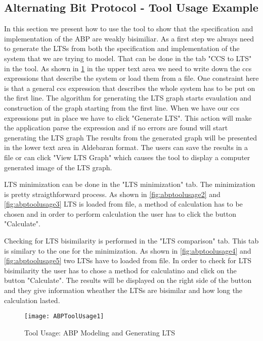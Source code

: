 \subsection{Alternating Bit Protocol - Tool Usage Example}
In this section we present how to use the tool to show that the specification and 
implementation of the ABP are weakly bisimiliar. As a first step we always need to
generate the LTSs from both the specification and implementation of the system that
we are trying to model. That can be done in the tab "CCS to LTS" in the tool. As shown
in \ref{fig:abptoolusage1} in the upper text area we need to write down the ccs 
expressions that describe the system or load them from a file. One constraint here
is that a general ccs expression that describes the whole system has to be put on
the first line. The algorithm for generating the LTS graph starts evaulation and 
construction of the graph starting from the first line. When we have our ccs expressions
put in place we have to click "Generate LTS". This action will make the application
parse the expression and if no errors are found will start generating the LTS graph
The results from the generated graph will be presented in the lower text area in 
Aldebaran format. The users can save the results in a file or can click "View LTS Graph" 
which causes the tool to display a computer generated image of the LTS graph.

LTS minimization can be done in the "LTS minimization" tab. The minimization is pretty 
straigthforward process. As shown in \ref{fig:abptoolusage2} and \ref{fig:abptoolusage3}
LTS is loaded from file, a method of calculation has to be chosen and in order to perform
calculation the user has to click the button "Calculate".

Checking for LTS bisimilarity is performed in the "LTS comparison" tab. This tab is 
similary to the one for the minimization. As shown in \ref{fig:abptoolusage4} and
\ref{fig:abptoolusage5} two LTSs have to loaded from file. In order to check for LTS 
bisimilarity the user has to chose a method for calculatino and click on the button 
"Calculate". The results will be displayed on the right side of the button and they
give information wheather the LTSs are bisimilar and how long the calculation lasted.

\begin{figure}[!ht]
\centering
\texttt{[image: ABPToolUsage1]}
\caption{Tool Usage: ABP Modeling and Generating LTS}
\label{fig:abptoolusage1}
\end{figure}


